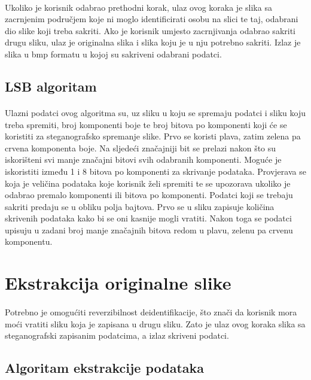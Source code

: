 \documentclass[times, utf8, seminar]{fer}
\begin{document}
\paragraph{}
Ukoliko je korisnik odabrao prethodni korak, ulaz ovog koraka je slika sa zacrnjenim područjem koje ni moglo identificirati osobu na slici te taj, odabrani dio slike koji treba sakriti. Ako je korisnik umjesto zacrnjivanja odabrao sakriti drugu sliku, ulaz je originalna slika i slika koju je u nju potrebno sakriti. Izlaz je slika u bmp formatu u kojoj su sakriveni odabrani podatci.
\subsection{LSB algoritam}
\paragraph{}
Ulazni podatci ovog algoritma su, uz sliku u koju se spremaju podatci i sliku koju treba spremiti, broj komponenti boje te broj bitova po komponenti koji će se koristiti za steganografsko spremanje slike. Prvo se koristi plava, zatim zelena pa crvena komponenta boje. Na sljedeći značajniji bit se prelazi nakon što su iskorišteni svi manje značajni bitovi svih odabranih komponenti. Moguće je iskoristiti između 1 i 8 bitova po komponenti za skrivanje podataka. Provjerava se koja je veličina podataka koje korisnik želi spremiti te se upozorava ukoliko je odabrao premalo komponenti ili bitova po komponenti.
Podatci koji se trebaju sakriti predaju se u obliku polja bajtova. Prvo se u sliku zapisuje količina skrivenih podataka kako bi se oni kasnije mogli vratiti. Nakon toga se podatci upisuju u zadani broj manje značajnih bitova redom u plavu, zelenu pa crvenu komponentu.
\section{Ekstrakcija originalne slike}
\paragraph{}
Potrebno je omogućiti reverzibilnost deidentifikacije, što znači da korisnik mora moći vratiti sliku koja je zapisana u drugu sliku. Zato je ulaz ovog koraka slika sa steganografski zapisanim podatcima, a izlaz skriveni podatci.
\subsection{Algoritam ekstrakcije podataka}
\end{document}
